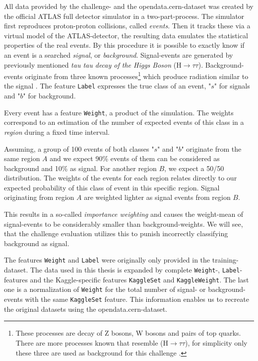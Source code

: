 All data provided by the challenge- and the opendata.cern-dataset \cite{higgsData} was created by the official ATLAS full detector simulator in a two-part-process. The simulator first reproduces proton-proton collisions, called \emph{events}. Then it tracks these via a virtual model of the ATLAS-detector, the resulting data emulates the statistical properties of the real events. By this procedure it is possible to exactly know if an event is a searched \emph{signal}, or \emph{background}. Signal-events are generated by previously mentioned \emph{tau tau decay of the Higgs Boson} ($\mathrm{H}\rightarrow\tau\tau $). Background-events originate from three known processes\footnote{These processes are decay of Z bosons, W bosons and pairs of top quarks. There are more processes known that resemble ($\mathrm{H}\rightarrow\tau\tau $), for simplicity only these three are used as background for this challenge \cite{higgsPaper}.} which produce radiation similar to the signal \cite{higgsPaper}. The feature \texttt{Label} expresses the true class of an event, "$s$" for signals and "$b$" for background.

Every event has a feature \texttt{Weight}, a product of the simulation. The weights correspond to an estimation of the number of expected events of this class in a \emph{region} during a fixed time interval\cite{higgsPaper}.

Assuming, a group of 100 events of both classes "$s$" and "$b$" originate from the same region $A$ and we expect 90\% events of them can be considered as background and 10\% as signal. For another region $B$, we expect a 50/50 distribution. The weights of the events for each region relates directly to our expected probability of this class of event in this specific region. Signal originating from region $A$ are weighted lighter as signal events from region $B$.

This results in a so-called \emph{importance weighting} and causes the weight-mean of signal-events to be considerably smaller than background-weights. We will see, that the challenge evaluation utilizes this to punish incorrectly classifying background as signal.

The features \texttt{Weight} and \texttt{Label} were originally only provided in the training-dataset. The data used in this thesis is expanded by complete \texttt{Weight}-, \texttt{Label}-features and the Kaggle-specific features \texttt{KaggleSet} and \texttt{KaggleWeight}. The last one is a normalization of \texttt{Weight} for the total number of signal- or background-events with the same \texttt{KaggleSet} feature.
This information enables us to recreate the original datasets using the opendata.cern-dataset.

